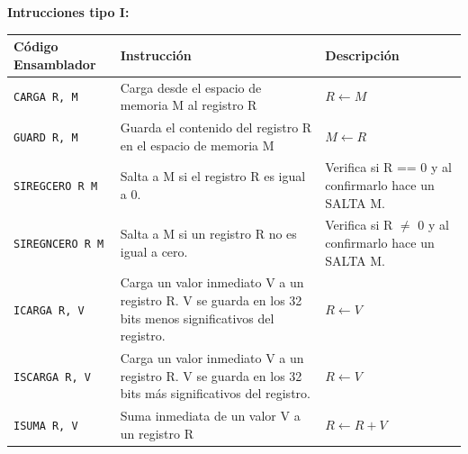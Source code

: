 \documentclass{article}
\begin{document}
\textbf{Intrucciones tipo I:}

\begin{longtable}{|p{}|p{}|p{}|}
  \hline
  \textbf{Código Ensamblador} & \textbf{Instrucción}                                                                                      & \textbf{Descripción}                                                                                                \\
  \hline
  \texttt{CARGA R, M}         & Carga desde el espacio de memoria M al registro R                                                         & $R \leftarrow M$                                                                                                    \\
  \hline
  \texttt{GUARD R, M}         & Guarda el contenido del registro R en el espacio de memoria M                                             & $M \leftarrow R$                                                                                                    \\
  \hline
  \texttt{SIREGCERO R M}      & Salta a M si el registro R es igual a 0.                                                                  & Verifica si R == 0 y al confirmarlo hace un SALTA M.                                                                \\
  \hline
  \texttt{SIREGNCERO R M}     & Salta a M si un registro R no es igual a cero.                                                            & Verifica si R $\neq$ 0 y al confirmarlo hace un SALTA M.                                                            \\
  \hline
  \texttt{ICARGA R, V}        & Carga un valor inmediato V a un registro R. V se guarda en los 32 bits menos significativos del registro. & $R \leftarrow V$                                                                                                    \\
  \hline
  \texttt{ISCARGA R, V}       & Carga un valor inmediato V a un registro R.  V se guarda en los 32 bits más significativos del registro.  & $R \leftarrow V$                                                                                                    \\
  \hline
  \texttt{ISUMA R, V}         & Suma inmediata de un valor V a un registro R                                                              & $R \leftarrow R + V$                                                                                                \\

\end{longtable}
\end{document}
